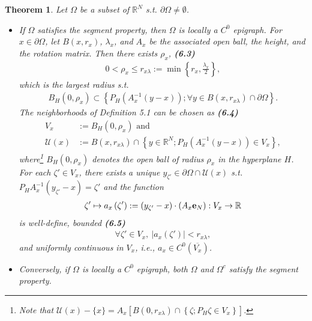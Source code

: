 \documentclass{book}
\numberwithin{equation}{section}
\newtheorem{theorem}{Theorem}[section]
\begin{document}
\begin{enumerate}
    \begin{theorem}
        Let $\Omega$ be a subset of $\mathbb{R}^N$ s.t. $\partial\Omega\ne\emptyset$.
        \begin{itemize}
            \item[(i)] If $\Omega$ satisfies the segment property, then $\Omega$ is locally a $C^0$ epigraph. For $x\in\partial\Omega$, let $B(x,r_x)$, $\lambda_x$, and $A_x$ be the associated open ball, the height, and the rotation matrix. Then there exists $\rho_x$, \textbf{(6.3)}
            \begin{align*}
                0 < \rho_x\le r_{x\lambda} := \min\left\{r_x,\frac{\lambda_x}{2}\right\},
            \end{align*}
            which is the largest radius s.t.
            \begin{align*}
                B_H\left(0,\rho_x\right)\subset\left\{P_H\left(A_x^{-1}(y - x)\right);\forall y\in B\left(x,r_{x\lambda}\right)\cap\partial\Omega\right\}.
            \end{align*}
            The neighborhoods of Definition 5.1 can be chosen as \textbf{(6.4)}
            \begin{align*}
                V_x &:= B_H\left(0,\rho_x\right) \mbox{ and }\\
                \mathcal{U}(x) &:= B\left(x,r_{x\lambda}\right)\cap\left\{y\in\mathbb{R}^N;P_H\left(A_x^{-1}(y - x)\right)\in V_x\right\},
            \end{align*}
            where\footnote{Note that $\mathcal{U}(x) - \{x\} = A_x\left[B\left(0,r_{x\lambda}\right)\cap\left\{\zeta;P_H\zeta\in V_x\right\}\right]$.} $B_H(0,\rho_x)$ denotes the open ball of radius $\rho_x$ in the hyperplane $H$. For each $\zeta'\in V_x$, there exists a unique $y_{\zeta'}\in\partial\Omega\cap\mathcal{U}(x)$ s.t. $P_HA_x^{-1}\left(y_{\zeta'} - x\right) = \zeta'$ and the function
            \begin{align*}
                \zeta'\mapsto a_x\left(\zeta'\right) := \left(y_{\zeta'} - x\right)\cdot\left(A_x{\bf e}_N\right):V_x\to\mathbb{R}
            \end{align*}
            is well-define, bounded \textbf{(6.5)}
            \begin{align*}
                \forall\zeta'\in V_x,\ \left|a_x\left(\zeta'\right)\right| < r_{x\lambda},
            \end{align*}
            and uniformly continuous in $V_x$, i.e., $a_x\in C^0\left(\overline{V_x}\right)$.
            \item[(ii)] Conversely, if $\Omega$ is locally a $C^0$ epigraph, both $\Omega$ and $\Omega^c$ satisfy the segment property.
        \end{itemize}
    \end{theorem}


\end{enumerate}
\end{document}
